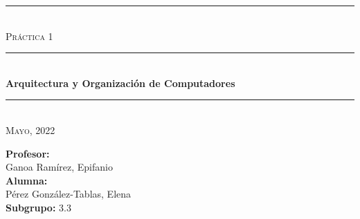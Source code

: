 \begin{titlepage}
	\begin{center}
		\rule{15cm}{0pt} \\
		[3cm]
		\textsc{\Large Práctica 1} \\
		\rule{15cm}{1pt} \\
		[0.25cm]
		\huge{\bfseries Arquitectura y Organización de Computadores} \\
		\rule{15cm}{1pt} \\
		[0.25cm]
		\textsc{\Large Mayo, 2022}\\
		[9cm]
	\end{center}
	\begin{flushright}
		\textbf{Profesor:} \\
		Ganoa Ramírez, Epifanio\\
		[0.25cm]
		\textbf{Alumna:} \\
		Pérez González-Tablas, Elena \\	
		[0.25cm]
		\textbf{Subgrupo:} 3.3 \\
	\end{flushright}
\end{titlepage}
\newpage
\begin{titlepage}
	\begin{flushleft}
	\end{flushleft}
\end{titlepage}